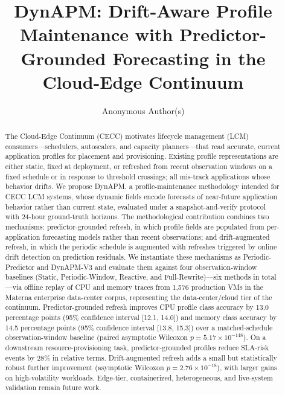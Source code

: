 \documentclass[manuscript,screen,review,anonymous]{acmart}
\begin{document}
\title[DynAPM: Drift-Aware Profile Maintenance]{DynAPM: Drift-Aware Profile Maintenance with
                    Predictor-Grounded Forecasting in the
                    Cloud-Edge Continuum}

\author{Anonymous Author(s)}
\renewcommand{\shortauthors}{Anonymous Author(s)}

\begin{abstract}
The Cloud-Edge Continuum (CECC) motivates lifecycle management (LCM)
consumers---schedulers, autoscalers, and capacity planners---that read
accurate, current application profiles for placement and provisioning.
Existing profile representations are either static, fixed at deployment,
or refreshed from recent observation windows on a fixed schedule or in
response to threshold crossings; all mis-track applications whose
behavior drifts. We propose DynAPM, a profile-maintenance methodology
intended for CECC LCM systems, whose dynamic fields encode forecasts of
near-future application behavior rather than current state, evaluated
under a snapshot-and-verify protocol with 24-hour ground-truth horizons.
The methodological contribution combines two mechanisms: predictor-grounded
refresh, in which profile fields are populated from per-application
forecasting models rather than recent observations; and drift-augmented
refresh, in which the periodic schedule is augmented with refreshes
triggered by online drift detection on prediction residuals. We instantiate
these mechanisms as Periodic-Predictor and DynAPM-V3 and evaluate them
against four observation-window baselines (Static, Periodic-Window,
Reactive, and Full-Rewrite)---six methods in total---via offline replay of
CPU and memory traces from 1{,}576 production VMs in the Materna
enterprise data-center corpus, representing the data-center/cloud tier of
the continuum. Predictor-grounded refresh improves CPU profile class
accuracy by 13.0 percentage points (95\% confidence interval [12.1, 14.0])
and memory class accuracy by 14.5 percentage points (95\% confidence
interval [13.8, 15.3]) over a matched-schedule observation-window baseline
(paired asymptotic Wilcoxon $p = 5.17 \times 10^{-148}$). On a downstream
resource-provisioning task, predictor-grounded profiles reduce SLA-risk
events by 28\% in relative terms. Drift-augmented refresh adds a small but
statistically robust further improvement (asymptotic Wilcoxon
$p = 2.76 \times 10^{-18}$), with larger gains on high-volatility
workloads. Edge-tier, containerized, heterogeneous, and live-system
validation remain future work.
\end{abstract}
\end{document}
